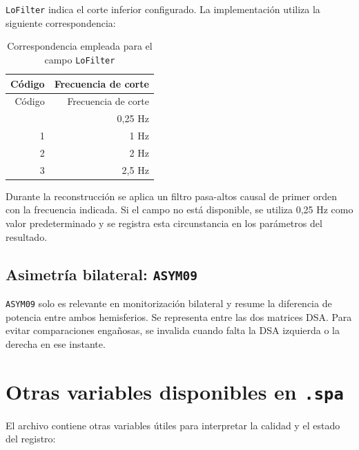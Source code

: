 \documentclass[
  spanish,
  a4paper,
  12pt,
  twoside]{memoir}
\begin{document}
\texttt{LoFilter} indica el corte inferior configurado. La
implementación utiliza la siguiente correspondencia:

\begin{longtable}[]{@{}rr@{}}
\caption{Correspondencia empleada para el campo
\protect\texttt{LoFilter}}\label{tbl-lofilter}\tabularnewline
\toprule\noalign{}
Código & Frecuencia de corte \\
\midrule\noalign{}
\endfirsthead
\toprule\noalign{}
Código & Frecuencia de corte \\
\midrule\noalign{}
\endhead
\bottomrule\noalign{}
\endlastfoot
0 & 0,25 Hz \\
1 & 1 Hz \\
2 & 2 Hz \\
3 & 2,5 Hz \\
\end{longtable}

Durante la reconstrucción se aplica un filtro pasa-altos causal de
primer orden con la frecuencia indicada. Si el campo no está disponible,
se utiliza 0,25 Hz como valor predeterminado y se registra esta
circunstancia en los parámetros del resultado.

\section{\texorpdfstring{Asimetría bilateral:
\texttt{ASYM09}}{Asimetría bilateral: ASYM09}}\label{asimetruxeda-bilateral-asym09}

\texttt{ASYM09} solo es relevante en monitorización bilateral y resume
la diferencia de potencia entre ambos hemisferios. Se representa entre
las dos matrices DSA. Para evitar comparaciones engañosas, se invalida
cuando falta la DSA izquierda o la derecha en ese instante.

\chapter{\texorpdfstring{Otras variables disponibles en
\texttt{.spa}}{Otras variables disponibles en .spa}}\label{otras-variables-disponibles-en-.spa}

El archivo contiene otras variables útiles para interpretar la calidad y
el estado del registro:
\end{document}
